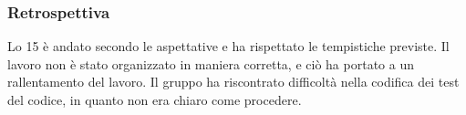 \subsubsection{Retrospettiva}
\label{sec:retrospettiva_sprint15}

Lo  15 è andato secondo le aspettative e ha rispettato le tempistiche previste.
Il lavoro non è stato organizzato in maniera corretta, e ciò ha portato a un rallentamento del lavoro.
Il gruppo ha riscontrato difficoltà nella codifica dei test del codice, in quanto non era chiaro come procedere.